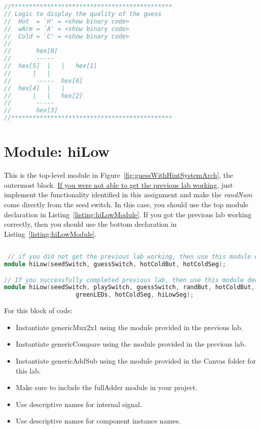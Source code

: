\begin{lstlisting}[language=Verilog,
 caption={A comment block describing the pattern of illuminated segment for each guess hint..},
 label={listing:hotColdGuess},
 frame=single]
//*********************************************
// Logic to display the quality of the guess
//	Hot  = `H' = <show binary code>
//	wArm = `A' = <show binary code>
//	Cold = `C' = <show binary code>
//
//		 hex[0]
//		 -----
//	hex[5]	|	|	hex[1]
//		|	|	
//		 -----	hex[6]
//	hex[4]	|	|
//		|	|	hex[2]
//		 -----
//		 hex[3]
//*********************************************
\end{lstlisting}


\section{Module: hiLow}
This is the top-level module in Figure~\ref{fig:guessWithHintSystemArch}, the outermost
block. \uline{If you were not able to get the previous lab working}, just
implement the functionality identified in this assignment and make the
\emph{randNum} come directly from the seed switch. In this case, you
should use the top module declaration in Listing~\ref{listing:hiLowModule}. If you got the
previous lab working correctly, then you should use the bottom
declaration in Listing~\ref{listing:hiLowModule}.



\begin{lstlisting}[language=Verilog,
 caption={The module declaration for the enhanced hiLow module if you did or did 
 not get the previous lab working.},
 label={listing:hiLowModule},
basicstyle=\tiny\ttfamily,
 frame=single]
 
 // if you did not get the previous lab working, then use this module declaration
module hiLow(seedSwitch, guessSwitch, hotColdBut, hotColdSeg);

// If you successfully completed previous lab, then use this module declaration (with no line break)
module hiLow(seedSwitch, playSwitch, guessSwitch, randBut, hotColdBut, hiLowBut, randMsbSeg, randLsbSeg, 
					greenLEDs, hotColdSeg, hiLowSeg);
 \end{lstlisting}
 
For this block of code:

\begin{itemize}
\item
  Instantiate genericMux2x1 using the module provided in the previous
  lab.
\item
  Instantiate genericCompare using the module provided in the previous
  lab.
\item
  Instantiate genericAddSub using the module provided in the Canvas
  folder for this lab.
\item
  Make sure to include the fullAdder module in your project.
\item
  Use descriptive names for internal signal.
\item
  Use descriptive names for component instance names.
\end{itemize}

